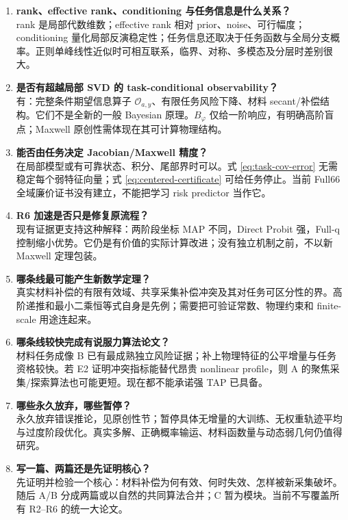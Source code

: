 \begin{enumerate}[label=\textbf{\arabic*.},leftmargin=2em]
\item \textbf{rank、effective rank、conditioning 与任务信息是什么关系？}\\
rank 是局部代数维数；effective rank 相对 prior、noise、可行幅度；conditioning 量化局部反演稳定性；任务信息还取决于任务函数与全局分支概率。正则单峰线性近似时可相互联系，临界、对称、多模态及分层时差别很大。

\item \textbf{是否有超越局部 SVD 的 task-conditional observability？}\\
有：完整条件期望信息算子 $\mathcal O_{a,y}$、有限任务风险下降、材料 secant/补偿结构。它们不是全新的一般 Bayesian 原理。$B_\varphi$ 仅给一阶响应，有明确高阶盲点；Maxwell 原创性需体现在其可计算物理结构。

\item \textbf{能否由任务决定 Jacobian/Maxwell 精度？}\\
在局部模型或有可靠状态、积分、尾部界时可以。式 \eqref{eq:task-cov-error} 无需稳定每个弱特征向量；式 \eqref{eq:centered-certificate} 可给任务停止。当前 Full66 全域廉价证书没有建立，不能把学习 risk predictor 当作它。

\item \textbf{R6 加速是否只是修复原流程？}\\
现有证据更支持这种解释：两阶段坐标 MAP 不同，Direct Probit 强，Full-q 控制缩小优势。它仍是有价值的实际计算改进；没有独立机制之前，不以新 Maxwell 定理包装。

\item \textbf{哪条线最可能产生新数学定理？}\\
真实材料补偿的有限有效域、共享采集补偿冲突及其对任务可区分性的界。高阶递推和最小二乘恒等式自身是先例；需要把可验证常数、物理约束和 finite-scale 用途连起来。

\item \textbf{哪条线较快完成有说服力算法论文？}\\
材料任务成像 B 已有最成熟独立风险证据；补上物理特征的公平增量与任务资格较快。若 E2 证明冲突指标能替代昂贵 nonlinear profile，则 A 的聚焦采集/探索算法也可能更短。现在都不能承诺强 TAP 已具备。

\item \textbf{哪些永久放弃，哪些暂停？}\\
永久放弃错误推论，见原创性节；暂停具体无增量的大训练、无权重轨迹平均与过度阶段优化。真实多解、正确概率输运、材料函数量与动态弱几何仍值得研究。

\item \textbf{写一篇、两篇还是先证明核心？}\\
先证明并检验一个核心：材料补偿为何有效、何时失效、怎样被新采集破坏。随后 A/B 分成两篇或以自然的共同算法合并；C 暂为模块。当前不写覆盖所有 R2--R6 的统一大论文。
\end{enumerate}

